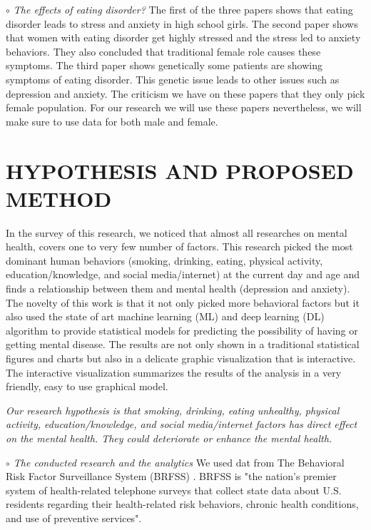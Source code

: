 \documentclass[letterpaper, 10 pt, conference]{ieeeconf}  %
\begin{document}
\par\noindent\textit{$\circ$ The effects of eating disorder?}\newline
The first of the three papers \cite{sassaroli2005role} shows that eating disorder leads to stress and anxiety in 
high school girls. The second paper \cite{martz1995relationship} shows that women with eating disorder 
get highly stressed and the stress led to anxiety behaviors. They also concluded that 
traditional female role causes these symptoms. The third paper \cite{striegel2007risk} shows genetically 
some patients are showing symptoms of eating disorder. This genetic issue leads 
to other issues such as depression and anxiety. The criticism we have on these papers that they only pick 
female population. For our research we will use 
these papers nevertheless, we will make sure to use data for both male and female.  

\setlength{\parskip}{.5em} %
\section{HYPOTHESIS AND PROPOSED METHOD}
In the survey of this research, we noticed that almost all researches on mental health, covers one to very few 
number of factors. This research picked the most dominant human behaviors (smoking, drinking, eating, physical activity, 
education/knowledge, and social media/internet) at the current day and age and finds a relationship between 
them and mental health (depression and anxiety). The novelty of this work is that it not only picked more behavioral 
factors but it also used the state of art machine learning (ML) and deep learning (DL) algorithm to provide statistical models for predicting 
the possibility of having or getting mental disease. The results are not only shown in a traditional statistical 
figures and charts but also in a delicate graphic visualization that 
is interactive. The interactive visualization summarizes the results of the analysis in a very friendly, easy to use graphical model.

\noindent\textit{Our research hypothesis is that smoking, drinking, eating unhealthy, physical activity, 
education/knowledge, and social media/internet factors has direct effect on the mental health. They could deteriorate or
enhance the mental health.}

\par\noindent\textit{$\circ$ The conducted research and the analytics}\newline
We used dat from The Behavioral Risk Factor Surveillance System (BRFSS) \cite{brfss}.
BRFSS is "the nation's premier system of health-related 
telephone surveys that collect state data about U.S. residents regarding their health-related risk behaviors, 
chronic health conditions, and use of preventive services"\cite{brfss}.
\end{document}
